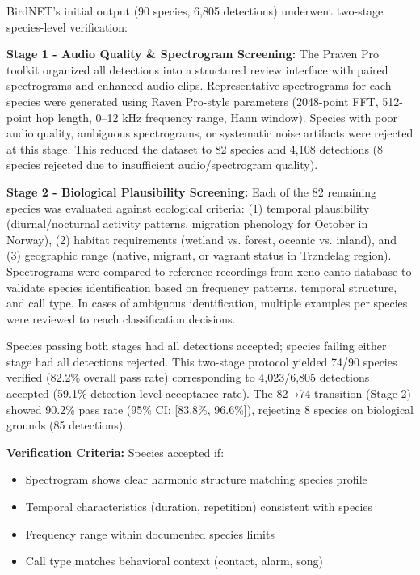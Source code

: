\documentclass[twocolumn]{article}
\begin{document}
BirdNET's initial output (90 species, 6,805 detections) underwent two-stage species-level verification:

\textbf{Stage 1 - Audio Quality \& Spectrogram Screening:} The Praven Pro toolkit organized all detections into a structured review interface with paired spectrograms and enhanced audio clips. Representative spectrograms for each species were generated using Raven Pro-style parameters (2048-point FFT, 512-point hop length, 0--12 kHz frequency range, Hann window). Species with poor audio quality, ambiguous spectrograms, or systematic noise artifacts were rejected at this stage. This reduced the dataset to 82 species and 4,108 detections (8 species rejected due to insufficient audio/spectrogram quality).

\textbf{Stage 2 - Biological Plausibility Screening:} Each of the 82 remaining species was evaluated against ecological criteria: (1) temporal plausibility (diurnal/nocturnal activity patterns, migration phenology for October in Norway), (2) habitat requirements (wetland vs. forest, oceanic vs. inland), and (3) geographic range (native, migrant, or vagrant status in Trøndelag region). Spectrograms were compared to reference recordings from xeno-canto database to validate species identification based on frequency patterns, temporal structure, and call type. In cases of ambiguous identification, multiple examples per species were reviewed to reach classification decisions.

Species passing both stages had all detections accepted; species failing either stage had all detections rejected. This two-stage protocol yielded 74/90 species verified (82.2\% overall pass rate) corresponding to 4,023/6,805 detections accepted (59.1\% detection-level acceptance rate). The 82→74 transition (Stage 2) showed 90.2\% pass rate (95\% CI: [83.8\%, 96.6\%]), rejecting 8 species on biological grounds (85 detections).

\textbf{Verification Criteria:} Species accepted if:
\begin{itemize}
\item Spectrogram shows clear harmonic structure matching species profile
\item Temporal characteristics (duration, repetition) consistent with species
\item Frequency range within documented species limits
\item Call type matches behavioral context (contact, alarm, song)
\end{itemize}
\end{document}

